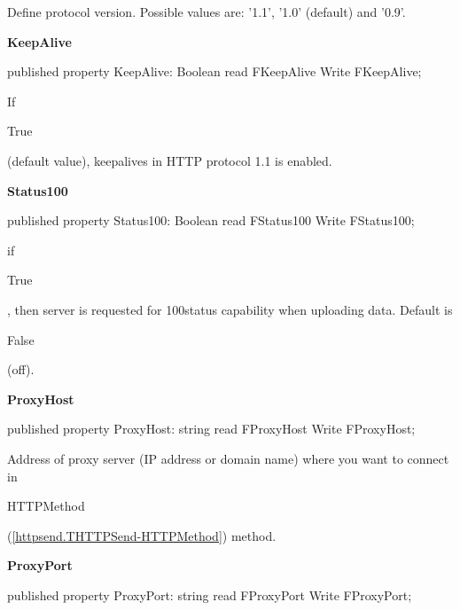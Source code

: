 \documentclass{report}
\newif\ifpdf
\begin{document}
\begin{list}{}
\begin{flushleft}
\ifpdf
\end{flushleft}
\fi


\par Define protocol version. Possible values are: '1.1', '1.0' (default) and '0.9'.\label{httpsend.THTTPSend-KeepAlive}
\item[\textbf{KeepAlive}\hfill]
\ifpdf
\begin{flushleft}
\fi
\begin{ttfamily}
published property KeepAlive: Boolean read FKeepAlive Write FKeepAlive;\end{ttfamily}

\ifpdf
\end{flushleft}
\fi


\par If \begin{ttfamily}True\end{ttfamily} (default value), keepalives in HTTP protocol 1.1 is enabled.\label{httpsend.THTTPSend-Status100}
\item[\textbf{Status100}\hfill]
\ifpdf
\begin{flushleft}
\fi
\begin{ttfamily}
published property Status100: Boolean read FStatus100 Write FStatus100;\end{ttfamily}

\ifpdf
\end{flushleft}
\fi


\par if \begin{ttfamily}True\end{ttfamily}, then server is requested for 100status capability when uploading data. Default is \begin{ttfamily}False\end{ttfamily} (off).\label{httpsend.THTTPSend-ProxyHost}
\item[\textbf{ProxyHost}\hfill]
\ifpdf
\begin{flushleft}
\fi
\begin{ttfamily}
published property ProxyHost: string read FProxyHost Write FProxyHost;\end{ttfamily}

\ifpdf
\end{flushleft}
\fi


\par Address of proxy server (IP address or domain name) where you want to connect in \begin{ttfamily}HTTPMethod\end{ttfamily}(\ref{httpsend.THTTPSend-HTTPMethod}) method.\label{httpsend.THTTPSend-ProxyPort}
\item[\textbf{ProxyPort}\hfill]
\ifpdf
\begin{flushleft}
\fi
\begin{ttfamily}
published property ProxyPort: string read FProxyPort Write FProxyPort;\end{ttfamily}


\end{flushleft}
\end{list}
\end{document}
